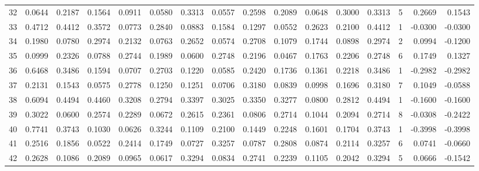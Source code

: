 \begin{tabular}{lrrrrrrrrrrrrrrr}
32  &      0.0644 &  0.2187 &  0.1564 &  0.0911 &  0.0580 &  0.3313 &  0.0557 &  0.2598 &  0.2089 &  0.0648 &   0.3000 &     0.3313 &      5 &                    0.2669 &                     0.1543 \\
33  &      0.4712 &  0.4412 &  0.3572 &  0.0773 &  0.2840 &  0.0883 &  0.1584 &  0.1297 &  0.0552 &  0.2623 &   0.2100 &     0.4412 &      1 &                   -0.0300 &                    -0.0300 \\
34  &      0.1980 &  0.0780 &  0.2974 &  0.2132 &  0.0763 &  0.2652 &  0.0574 &  0.2708 &  0.1079 &  0.1744 &   0.0898 &     0.2974 &      2 &                    0.0994 &                    -0.1200 \\
35  &      0.0999 &  0.2326 &  0.0788 &  0.2744 &  0.1989 &  0.0600 &  0.2748 &  0.2196 &  0.0467 &  0.1763 &   0.2206 &     0.2748 &      6 &                    0.1749 &                     0.1327 \\
36  &      0.6468 &  0.3486 &  0.1594 &  0.0707 &  0.2703 &  0.1220 &  0.0585 &  0.2420 &  0.1736 &  0.1361 &   0.2218 &     0.3486 &      1 &                   -0.2982 &                    -0.2982 \\
37  &      0.2131 &  0.1543 &  0.0575 &  0.2778 &  0.1250 &  0.1251 &  0.0706 &  0.3180 &  0.0839 &  0.0998 &   0.1696 &     0.3180 &      7 &                    0.1049 &                    -0.0588 \\
38  &      0.6094 &  0.4494 &  0.4460 &  0.3208 &  0.2794 &  0.3397 &  0.3025 &  0.3350 &  0.3277 &  0.0800 &   0.2812 &     0.4494 &      1 &                   -0.1600 &                    -0.1600 \\
39  &      0.3022 &  0.0600 &  0.2574 &  0.2289 &  0.0672 &  0.2615 &  0.2361 &  0.0806 &  0.2714 &  0.1044 &   0.2094 &     0.2714 &      8 &                   -0.0308 &                    -0.2422 \\
40  &      0.7741 &  0.3743 &  0.1030 &  0.0626 &  0.3244 &  0.1109 &  0.2100 &  0.1449 &  0.2248 &  0.1601 &   0.1704 &     0.3743 &      1 &                   -0.3998 &                    -0.3998 \\
41  &      0.2516 &  0.1856 &  0.0522 &  0.2414 &  0.1749 &  0.0727 &  0.3257 &  0.0787 &  0.2808 &  0.0874 &   0.2114 &     0.3257 &      6 &                    0.0741 &                    -0.0660 \\
42  &      0.2628 &  0.1086 &  0.2089 &  0.0965 &  0.0617 &  0.3294 &  0.0834 &  0.2741 &  0.2239 &  0.1105 &   0.2042 &     0.3294 &      5 &                    0.0666 &                    -0.1542 \\

\end{tabular}
